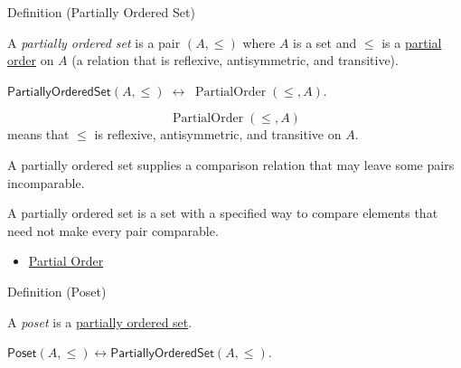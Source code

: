 \begin{definitionbox}{Definition (Partially Ordered Set)}
\begin{definition}\label{def:partially-ordered-set}
A \emph{partially ordered set} is a pair $(A,\leq)$ where $A$ is a set and
$\leq$ is a \hyperref[def:partial-order]{partial order} on $A$ (a relation that
is reflexive, antisymmetric, and transitive).
\end{definition}
\end{definitionbox}

\begin{remark*}
$\mathsf{PartiallyOrderedSet}(A,\leq)\;\leftrightarrow\;
\operatorname{PartialOrder}(\leq,A)$.
\end{remark*}

\begin{remark*}
\[
  \operatorname{PartialOrder}(\leq,A)
\] means that $\leq$ is reflexive,
antisymmetric, and transitive on $A$.
\end{remark*}

\begin{remark*}[Interpretation]
A partially ordered set supplies a comparison relation that may leave some
pairs incomparable.
\end{remark*}

\begin{remark*}[Exposition]
A partially ordered set is a set with a specified way to compare elements that
need not make every pair comparable.
\end{remark*}

\begin{dependencies}
\begin{itemize}
  \item \hyperref[def:partial-order]{Partial Order}
\end{itemize}
\end{dependencies}

\begin{definitionbox}{Definition (Poset)}
\begin{definition}[Poset]\label{def:poset}
A \emph{poset} is a \hyperref[def:partially-ordered-set]{partially ordered set}.
\end{definition}
\end{definitionbox}

\begin{remark*}
$\mathsf{Poset}(A,\leq)\leftrightarrow
\mathsf{PartiallyOrderedSet}(A,\leq)$.
\end{remark*}

